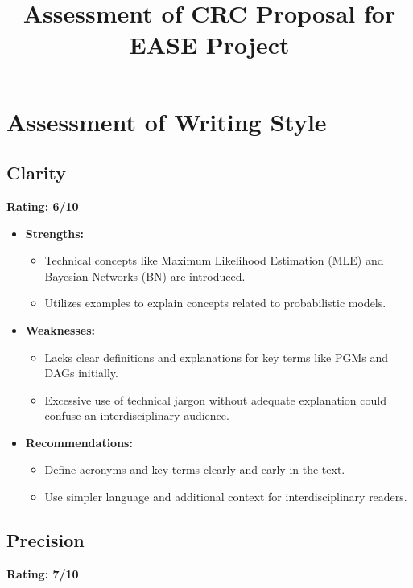 \documentclass{article}
\title{Assessment of CRC Proposal for EASE Project}
\author{}
\date{}
\begin{document}
\maketitle

\section{Assessment of Writing Style}

\subsection{Clarity}
\textbf{Rating: 6/10}

\begin{itemize}
    \item \textbf{Strengths:}
    \begin{itemize}
        \item Technical concepts like Maximum Likelihood Estimation (MLE) and Bayesian Networks (BN) are introduced.
        \item Utilizes examples to explain concepts related to probabilistic models.
    \end{itemize}
    \item \textbf{Weaknesses:}
    \begin{itemize}
        \item Lacks clear definitions and explanations for key terms like PGMs and DAGs initially.
        \item Excessive use of technical jargon without adequate explanation could confuse an interdisciplinary audience.
    \end{itemize}
    \item \textbf{Recommendations:}
    \begin{itemize}
        \item Define acronyms and key terms clearly and early in the text.
        \item Use simpler language and additional context for interdisciplinary readers.
    \end{itemize}
\end{itemize}

\subsection{Precision}
\textbf{Rating: 7/10}
\end{document}
